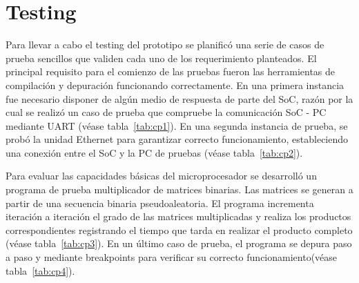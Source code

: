 		
\newpage
		\section{Testing} \label {testing:proto1}

Para llevar a cabo el testing del prototipo se planificó una serie de casos de prueba sencillos que validen cada uno de los requerimiento planteados.
El principal requisito para el comienzo de las pruebas fueron las herramientas de compilación y depuración funcionando correctamente. En una primera
instancia fue necesario disponer de algún medio de respuesta de parte del SoC, razón por la cual se realizó un caso de prueba que compruebe la
comunicación SoC - PC mediante UART (véase tabla~\ref{tab:cp1}).  En una segunda instancia de prueba, se probó la unidad Ethernet para garantizar correcto funcionamiento, estableciendo una conexión entre el SoC y la PC de pruebas (véase tabla~\ref{tab:cp2}). 

Para evaluar las capacidades básicas del microprocesador se desarrolló un programa de prueba multiplicador de matrices binarias. Las matrices se
generan a partir de una secuencia binaria pseudoaleatoria. El programa incrementa iteración a iteración el grado de las matrices multiplicadas y
realiza los productos correspondientes registrando el tiempo que tarda en realizar el producto completo (véase tabla~\ref{tab:cp3}). En un último caso de prueba, el programa se
depura paso a paso y mediante breakpoints para verificar su correcto funcionamiento(véase tabla~\ref{tab:cp4}).

